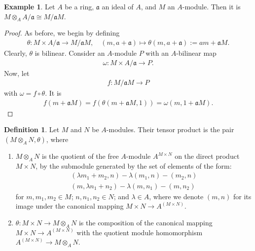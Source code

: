 \documentclass[a4paper]{book}
\theoremstyle{definition}
\newtheorem{definition}{Definition}[]
\newtheorem{example}{Example}[definition]
\begin{document}
\begin{example}
    Let \(A\) be a ring, \(\mathfrak{a}\) an ideal of \(A\), and \(M\) an \(A\)-module. Then it is \(M \otimes_A A / \mathfrak{a} \cong M / \mathfrak{a}M\).
\end{example}
\begin{proof}
    As before, we begin by defining
    \begin{align*}
        \theta: M \times A / \mathfrak{a} \rightarrow M / \mathfrak{a}M, \quad (m, a + \mathfrak{a}) \mapsto \theta(m, a + \mathfrak{a}) := am + \mathfrak{a}M \text{.}
    \end{align*}
    Clearly, \(\theta\) is bilinear. Consider an \(A\)-module \(P\) with an \(A\)-bilinear map
    \begin{align*}
        \omega: M \times A / \mathfrak{a} \rightarrow P \text{.}
    \end{align*}
    Now, let
    \begin{align*}
        f: M / \mathfrak{a}M \rightarrow P
    \end{align*}
    with \(\omega = f \circ \theta\). It is
    \begin{align*}
        f(m + \mathfrak{a}M) = f(\theta(m + \mathfrak{a}M, 1)) = \omega(m, 1 + \mathfrak{a}M) \text{.}
    \end{align*}
\end{proof}

\begin{defbox}
    \begin{definition}
        Let \(M\) and \(N\) be \(A\)-modules. Their tensor product is the pair \((M \otimes_A N, \theta)\), where
        \begin{enumerate}
            \item \(M \otimes_A N\) is the quotient of the free \(A\)-module \(A^{M \times N}\) on the direct product \(M \times N\), by the submodule generated by the set of elements of the form:
            \begin{align*}
                (\lambda m_1 + m_2, n) - \lambda (m_1, n) - (m_2, n) \\
                (m, \lambda n_1 + n_2) - \lambda (m, n_1) - (m, n_2)
            \end{align*}
            for \(m, m_1, m_2 \in M\); \(n, n_1, n_2 \in N\); and \(\lambda \in A\), where we denote \((m, n)\) for its image under the canonical mapping \(M \times N \rightarrow A^{(M \times N)}\).
            \item \(\theta: M \times N \rightarrow M \otimes_A N\) is the composition of the canonical mapping \(M \times N \rightarrow A^{(M \times N)}\) with the quotient module homomorphism \(A^{(M \times N)} \rightarrow M \otimes_A N\).
        \end{enumerate}
    \end{definition}
\end{defbox}
\end{document}

